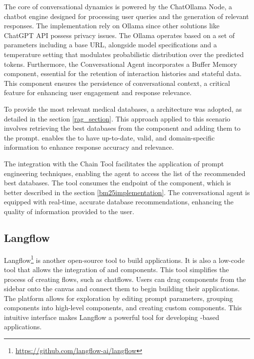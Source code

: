 The core of conversational dynamics is powered by the ChatOllama Node, a chatbot engine designed for processing user queries and the generation of relevant responses. The implementation rely on Ollama since other solutions like ChatGPT API possess privacy issues. The Ollama operates based on a set of parameters including a base URL, alongside model specifications and a temperature setting that modulates probabilistic distribution over the predicted tokens. Furthermore, the Conversational Agent incorporates a Buffer Memory component, essential for the retention of interaction histories and stateful data. This component ensures the persistence of conversational context, a critical feature for enhancing user engagement and response relevance.

To provide the most relevant medical databases, a {\rag} architecture was adopted, as detailed in the section \ref{rag_section}. This approach applied to this scenario involves retrieving the best databases from the {\ir} component and adding them to the {\llm} prompt. {\rag} enables the {\llm} to have up-to-date, valid, and domain-specific information to enhance response accuracy and relevance. 

The integration with the Chain Tool facilitates the application of prompt engineering techniques, enabling the agent to access the list of the recommended best databases. The tool consumes the endpoint of the {\ir} component, which is better described in the section \ref{bm25implementation}. The conversational agent is equipped with real-time, accurate database recommendations, enhancing the quality of information provided to the user. 


\subsection{Langflow}

Langflow\footnote{\url{https://github.com/langflow-ai/langflow}} is another open-source tool to build {\ai} applications. It is also a low-code tool that allows the integration of {\llm} and {\ai} components. This tool simplifies the process of creating flows, such as chatflows. Users can drag components from the sidebar onto the canvas and connect them to begin building their applications. The platform allows for exploration by editing prompt parameters, grouping components into high-level components, and creating custom components. This intuitive interface makes Langflow a powerful tool for developing {\llm}-based applications.

